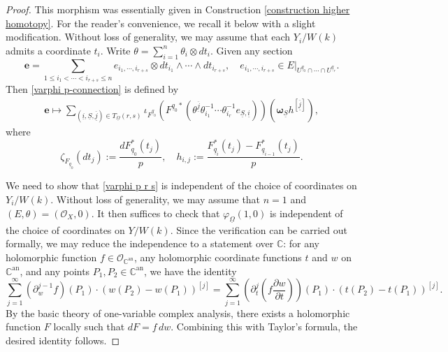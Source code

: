 \documentclass[12pt, a4paper]{article}
\begin{document}
\begin{proof}
This morphism was essentially given in Construction \ref{construction higher homotopy}. For the reader's convenience, we recall it below with a slight modification. Without loss of generality, we may assume  that each \( Y_i/W(k) \) admits a coordinate \( t_i \).
 Write $\theta=\sum_{i=1}^n\theta_i\otimes dt_i$. Given any section
$$
\boldsymbol{e}=\sum_{1\leq i_1<\cdots<i_{r+s}\leq n}e_{i_1,\cdots,i_{r+s}}\otimes dt_{i_1}\wedge\cdots\wedge dt_{i_{r+s}},\quad e_{i_1,\cdots,i_{r+s}}\in E|_{U^{\underline q_0}\cap\cdots\cap U^{\underline q_r}}.
$$
Then \eqref{varphi p-connection} is defined by
\begin{eqnarray}\label{varphi p r s}
\boldsymbol{e}\mapsto \sum_{(\underline i,\underline S,\underline{\overline j})\in T_{\underline\Omega}(r,s)}\iota_{F^{\underline q_0}}(F^{\underline q_0*}(\theta^{\underline{\overline j}}\theta_{i_1}^{-1}\cdots\theta_{i_r}^{-1}e_{\underline S,\underline i}))(\boldsymbol{\omega}_{\underline S}h^{[\underline{\overline j}]}),
\end{eqnarray}
where
$$
\zeta_{F_{\underline q_0}}(dt_j):=\frac{dF^*_{\underline q_0}(t_j)}{p},\quad h_{i,j}:=\frac{F^*_{\underline q_i}(t_j)-F^*_{\underline q_{i-1}}(t_j)}{p}.
$$

We need to show that \eqref{varphi p r s} is independent of the choice of coordinates on \( Y_i/W(k) \). Without loss of generality, we may assume that \( n = 1 \) and \( (E, \theta) = (\mathcal{O}_X, 0) \). It then suffices to check that \( \varphi_{\underline\Omega}(1, 0) \) is independent of the choice of coordinates on \( Y/W(k) \).
Since the verification can be carried out formally, we may reduce the independence to a statement over \( \mathbb{C} \): for any holomorphic function \( f \in \mathcal{O}_{\mathbb{C}^{\mathrm{an}}} \), any holomorphic coordinate functions \( t \) and \( w \) on \( \mathbb{C}^{\mathrm{an}} \), and any points \( P_1, P_2 \in \mathbb{C}^{\mathrm{an}} \), we have the identity
\[
\sum_{j=1}^\infty (\partial_w^{j-1} f)(P_1) \cdot (w(P_2) - w(P_1))^{[j]} 
= \sum_{j=1}^\infty \left( \partial_t^j \left( f \frac{\partial w}{\partial t} \right) \right)(P_1) \cdot (t(P_2) - t(P_1))^{[j]}.
\]
By the basic theory of one-variable complex analysis, there exists a holomorphic function \( F \) locally such that \( dF = f\,dw \). Combining this with Taylor's formula, the desired identity follows. 


\end{proof}
\end{document}
